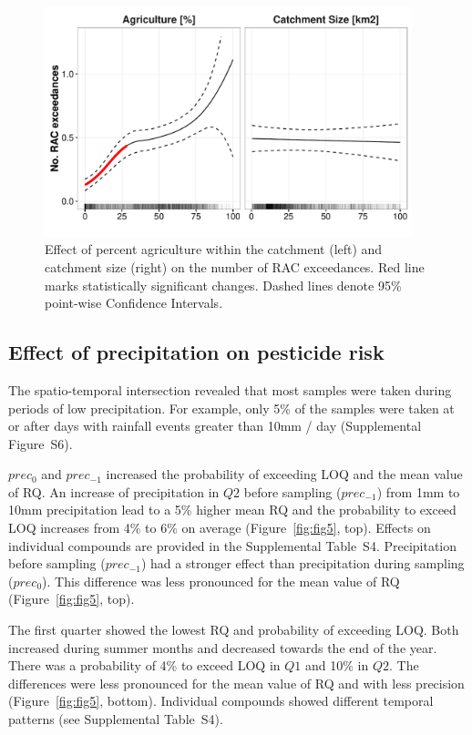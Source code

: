 \documentclass[journal=esthag,manuscript=article]{achemso}
\begin{document}
\begin{figure}[ht]
  \includegraphics[width=0.95\textwidth]{figure4.pdf}
  \caption{Effect of percent agriculture within the catchment (left) and catchment size (right) on the number of RAC exceedances. Red line marks statistically significant changes. Dashed lines denote 95\% point-wise Confidence Intervals.
  }
  \label{fig:fig4}
\end{figure}


\subsection{Effect of precipitation on pesticide risk}
The spatio-temporal intersection revealed that most samples were taken during periods of low precipitation.
For example, only 5\% of the samples were taken at or after days with rainfall events greater than 10mm / day (Supplemental Figure~S6). 

$prec_{0}$ and $prec_{-1}$ increased the probability of exceeding LOQ and the mean value of RQ.
An increase of precipitation in $Q2$ before sampling ($prec_{-1}$) from 1mm to 10mm precipitation lead to a 5\% higher mean RQ and the probability to exceed LOQ increases from 4\% to 6\% on average (Figure~\ref{fig:fig5}, top). %
Effects on individual compounds are provided in the Supplemental Table~S4.
Precipitation before sampling ($prec_{-1}$) had a stronger effect than precipitation during sampling ($prec_{0}$). 
This difference was less pronounced for the mean value of RQ (Figure~\ref{fig:fig5}, top). 

The first quarter showed the lowest RQ and probability of exceeding LOQ.
Both increased during summer months and decreased towards the end of the year.
There was a probability of 4\% to exceed LOQ in $Q1$ and 10\% in $Q2$.
The differences were less pronounced for the mean value of RQ and with less precision (Figure~\ref{fig:fig5}, bottom). 
Individual compounds showed different temporal patterns (see Supplemental Table~S4).
\end{document}
